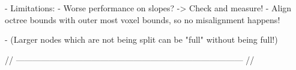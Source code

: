 - Limitations: 
    - Worse performance on slopes? -> Check and measure!
    - Align octree bounds with outer most voxel bounds, so no misalignment happens!

    - (Larger nodes which are not being split can be "full" without being full!)

// --------------------------------------------------------------------------------- //
